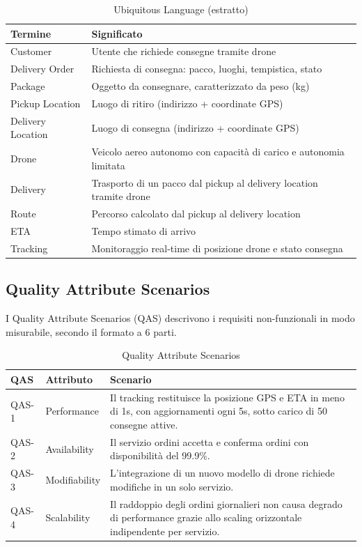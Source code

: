 \documentclass[12pt,a4paper]{article}
\begin{document}
\begin{table}[H]
\centering
\small
\begin{tabularx}{\textwidth}{lX}
\toprule
\textbf{Termine} & \textbf{Significato} \\
\midrule
Customer & Utente che richiede consegne tramite drone \\
Delivery Order & Richiesta di consegna: pacco, luoghi, tempistica, stato \\
Package & Oggetto da consegnare, caratterizzato da peso (kg) \\
Pickup Location & Luogo di ritiro (indirizzo + coordinate GPS) \\
Delivery Location & Luogo di consegna (indirizzo + coordinate GPS) \\
Drone & Veicolo aereo autonomo con capacit\`a di carico e autonomia limitata \\
Delivery & Trasporto di un pacco dal pickup al delivery location tramite drone \\
Route & Percorso calcolato dal pickup al delivery location \\
ETA & Tempo stimato di arrivo \\
Tracking & Monitoraggio real-time di posizione drone e stato consegna \\
\bottomrule
\end{tabularx}
\caption{Ubiquitous Language (estratto)}
\end{table}

\subsection{Quality Attribute Scenarios}

I Quality Attribute Scenarios (QAS) descrivono i requisiti non-funzionali in modo misurabile, secondo il formato a 6 parti.

\begin{table}[H]
\centering
\small
\begin{tabularx}{\textwidth}{llX}
\toprule
\textbf{QAS} & \textbf{Attributo} & \textbf{Scenario} \\
\midrule
QAS-1 & Performance & Il tracking restituisce la posizione GPS e ETA in meno di 1s, con aggiornamenti ogni 5s, sotto carico di 50 consegne attive. \\
QAS-2 & Availability & Il servizio ordini accetta e conferma ordini con disponibilit\`a del 99.9\%. \\
QAS-3 & Modifiability & L'integrazione di un nuovo modello di drone richiede modifiche in un solo servizio. \\
QAS-4 & Scalability & Il raddoppio degli ordini giornalieri non causa degrado di performance grazie allo scaling orizzontale indipendente per servizio. \\
\bottomrule
\end{tabularx}
\caption{Quality Attribute Scenarios}
\end{table}
\end{document}
